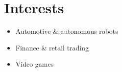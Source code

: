 \documentclass[letterpaper,12pt]{article}
\newcommand{\resumeItem}[1]{
  \item\small{
    {#1 \vspace{-2pt}}
  }
}
\newcommand{\resumeItemListStart}{\begin{itemize}}
\newcommand{\resumeItemListEnd}{\end{itemize}\vspace{-5pt}}
\begin{document}
\section{Interests}
\resumeItemListStart
  \resumeItem{Automotive \& autonomous robots}
  \resumeItem{Finance \& retail trading}
  \resumeItem{Video games}
\resumeItemListEnd

\end{document}
